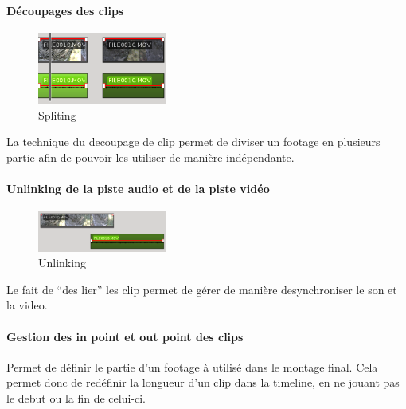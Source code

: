 \paragraph{Découpages des clips}
  \begin{figure}
    \vspace{-20pt}
    \begin{center}
      \includegraphics[width=0.38\textwidth]{images/splited}
    \end{center}
    \vspace{-20pt}
    \caption{Spliting}
    \label{Yes}
    \vspace{-10pt}
  \end{figure}
La technique du decoupage de clip permet de diviser un footage en plusieurs
partie afin de pouvoir les utiliser de manière indépendante.

\paragraph{}
\paragraph{Unlinking de la piste audio et de la piste vidéo}
  \begin{figure}
    \vspace{-20pt}
    \begin{center}
      \includegraphics[width=0.38\textwidth]{images/unlinked}
    \end{center}
    \vspace{-30pt}
    \caption{Unlinking}
    \label{Yes}
    \vspace{-10pt}
  \end{figure}
Le fait de ``des lier'' les clip permet de gérer de manière desynchroniser le son
et la video.

\paragraph{Gestion des in point et  out point des clips} %
  Permet de définir le partie d'un footage à utilisé dans le montage final. Cela permet donc de
  redéfinir la longueur d'un clip dans la timeline, en ne jouant pas le debut
  ou la fin de celui-ci.

